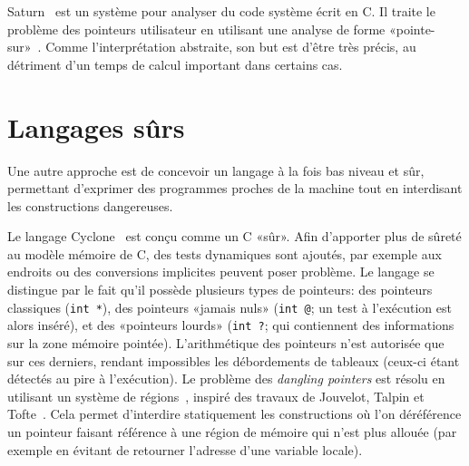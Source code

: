 Saturn~\cite{paste07} est un système pour analyser du code système écrit en C.
Il traite le problème des pointeurs utilisateur en utilisant une analyse de
forme «pointe-sur»~\cite{oakland08}. Comme l'interprétation abstraite, son but
est d'être très précis, au détriment d'un temps de calcul important dans
certains cas.


\section{Langages sûrs}

Une autre approche est de concevoir un langage à la fois bas niveau et sûr,
permettant d'exprimer des programmes proches de la machine tout en interdisant
les constructions dangereuses.

Le langage Cyclone~\cite{cyclone-safety} est conçu comme un C «sûr». Afin
d'apporter plus de sûreté au modèle mémoire de C, des tests dynamiques sont
ajoutés, par exemple aux endroits ou des conversions implicites peuvent poser
problème. Le langage se distingue par le fait qu'il possède plusieurs types de
pointeurs: des pointeurs classiques (\texttt{int *}), des pointeurs «jamais
nuls» (\texttt{int @}; un test à l'exécution est alors inséré), et des
«pointeurs lourds» (\verb!int ?!; qui contiennent des informations sur la zone
mémoire pointée). L'arithmétique des pointeurs n'est autorisée que sur ces
derniers, rendant impossibles les débordements de tableaux (ceux-ci étant
détectés au pire à l'exécution). Le problème des \emph{dangling pointers} est
résolu en utilisant un système de régions~\cite{cyclone-regions}, inspiré des
travaux de Jouvelot, Talpin et \linebreak Tofte~\cite{jfp92,ToTa1993,popl94}.
Cela permet d'interdire statiquement les constructions où l'on déréférence un
pointeur faisant référence à une région de mémoire qui n'est plus allouée (par
exemple en évitant de retourner l'adresse d'une variable locale).


